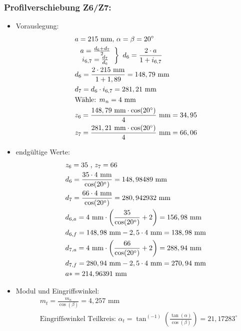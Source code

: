 \subsubsection{Profilverschiebung Z6/Z7:}
\begin{itemize}
\item Vorauslegung:
\begin{align*}
	&a= 215 \text{ mm, } \alpha = \beta = 20^\circ \\
	&\left. \begin{array}{c} a= \frac{d_6 + d_7}{2}\\i_{6,7} = \frac{d_7}{d_6} \end{array} \right\} \text{ }d_6 = \frac{2 \cdot a}{1+i_{6,7}} \\
	&d_6 = \frac{2\cdot 215 \text{ mm}}{1+1,89} = 148,79\text{ mm} \\
	&d_7 = d_6 \cdot i_{6,7} = 281,21 \text{ mm}\\
	&\text{Wähle: }m_n = 4 \text{ mm} \\
	&z_6 = \frac{148,79 \text{ mm} \cdot \cos(20^\circ)}{4 } \text{ mm} = 34,95\\
	&z_7 = \frac{281,21 \text{ mm} \cdot \cos(20^\circ)}{4 } \text{ mm} = 66,06
\end{align*}
\item endgültige Werte:
\begin{align*}
	&z_6 = 35 \text{ , } z_7 = 66 \\
	&d_6 = \frac{35 \cdot 4\text{ mm} }{\cos(20^\circ)} = 148,98489 \text{ mm} \\
	&d_7 = \frac{66\cdot 4\text{ mm} }{\cos(20^\circ)} = 280,942932\text{ mm} \\
	&d_{6,a} = 4\text{ mm} \cdot \left(\frac{35}{\cos(20^\circ)}+2\right) =156,98\text{ mm} \\
	&d_{6,f} = 148,98\text{ mm} -2,5 \cdot 4\text{ mm} =138,98\text{ mm} \\
	&d_{7,a} = 4\text{ mm} \cdot \left(\frac{66}{\cos(20^\circ)}+2\right) =288,94\text{ mm} \\
	&d_{7,f} = 280,94\text{ mm} -2,5 \cdot 4\text{ mm} =270,94\text{ mm} \\
	&a* = 214,96391 \text{ mm} 
\end{align*}
\item Modul und Eingriffswinkel:
\begin{align*}
	&m_t = \frac{m_n}{\cos(\beta)} = 4,257\text{ mm} \\
	&\text{Eingriffswinkel Teilkreis: } \alpha_t = \tan^(-1) \left( \frac{\tan(\alpha)}{\cos(\beta)} \right) = 21,17283 ^\circ \\

\end{align*}
\end{itemize}
